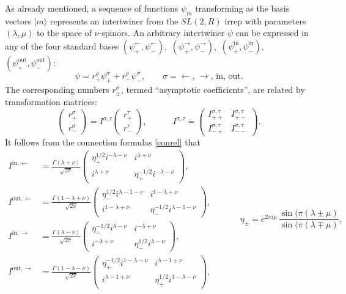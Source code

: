 \documentclass[12pt]{article}
\newcommand{\lt}{\left}
\newcommand{\rt}{\right}
\newcommand*{\ket}[1]{|{#1}\rangle}
\newcommand{\RR}{\mathbb{R}}
\DeclareMathOperator{\SL}{SL}
\newcommand{\lar}{{\leftarrow}}
\newcommand{\rar}{{\rightarrow}}
\newcommand{\IN}{\text{in}}
\newcommand{\OUT}{\text{out}}
\def\widetilde#1{#1}%
\def\SL{SL}
\def\RR{R}
\begin{document}
As already mentioned, a sequence of functions $\psi_m$ transforming as the basis vectors $\ket{m}$ represents an intertwiner from the $\widetilde{\SL}(2,\RR)$ irrep with parameters $(\lambda,\mu)$ to the space of $\nu$-spinors. An arbitrary intertwiner $\psi$ can be expressed in any of the four standard bases $\lt( \psi^{\lar}_{+},\psi^{\lar}_{-} \rt)$,\, $\lt(\psi^{\rar}_{+},\psi^{\rar}_{-} \rt)$,\, $\lt( \psi^{\IN}_{+},\psi^{\IN}_{-} \rt)$,\, $\lt( \psi^{\OUT}_{+},\psi^{\OUT}_{-} \rt)$:
\begin{equation}
\psi=r^{\sigma}_{+}\psi^{\sigma}_{+}+r^{\sigma}_{-}\psi^{\sigma}_{-},\qquad
\sigma=\lar,\,\rar,\,\IN,\,\OUT.
\end{equation}
The corresponding numbers $r^{\sigma}_{\pm}$, termed ``asymptotic coefficients'', are related by transformation matrices:
\begin{equation}
\begin{pmatrix}r^{\sigma}_{+}\\[2pt] r^{\sigma}_{-}\end{pmatrix}
=I^{\sigma,\tau}
\begin{pmatrix}r^{\tau}_{+}\\[2pt] r^{\tau}_{-}\end{pmatrix},\qquad\quad
I^{\sigma,\tau}=\begin{pmatrix}
I^{\sigma,\tau}_{++} & I^{\sigma,\tau}_{+-}\\[2pt]
I^{\sigma,\tau}_{-+} & I^{\sigma,\tau}_{--}
\end{pmatrix}.
\end{equation}
It follows from the connection formulas \eqref{conrel} that
\begin{equation}
\begin{aligned}
I^{\IN,\lar}&= \frac{\Gamma(\lambda+\nu)}{\sqrt{2\pi}}
\begin{pmatrix}
\eta_{+}^{1/2}i^{-\lambda-\nu} & i^{\lambda+\nu}\\[2pt]
i^{\lambda+\nu} & \eta_{+}^{-1/2}i^{-\lambda-\nu} 
\end{pmatrix},
\\[8pt]
I^{\OUT,\lar}&= \frac{\Gamma(1-\lambda+\nu)}{\sqrt{2\pi}}
\begin{pmatrix}
\eta_{-}^{1/2}i^{\lambda-1-\nu} & i^{1-\lambda+\nu}\\[2pt]
i^{1-\lambda+\nu} & \eta_{-}^{-1/2}i^{\lambda-1-\nu}
\end{pmatrix},
\\[8pt]
I^{\IN,\rar}&= \frac{\Gamma(\lambda-\nu)}{\sqrt{2\pi}}
\begin{pmatrix}
\eta_{-}^{-1/2}i^{\lambda-\nu} & i^{-\lambda+\nu}\\[2pt]
i^{-\lambda+\nu} & \eta_{-}^{1/2}i^{\lambda-\nu} 
\end{pmatrix},
\\[8pt]
I^{\OUT,\rar}&= \frac{\Gamma(1-\lambda-\nu)}{\sqrt{2\pi}}
\begin{pmatrix}
\eta_{+}^{-1/2}i^{1-\lambda-\nu} & i^{\lambda-1+\nu}\\[2pt]
i^{\lambda-1+\nu} & \eta_{+}^{1/2}i^{1-\lambda-\nu}
\end{pmatrix},
\end{aligned}\qquad\quad
\eta_{\pm}=e^{2\pi i\mu}\,
\frac{\sin(\pi(\lambda\pm\mu)}{\sin(\pi(\lambda\mp\mu)},
\end{equation}
\end{document}
